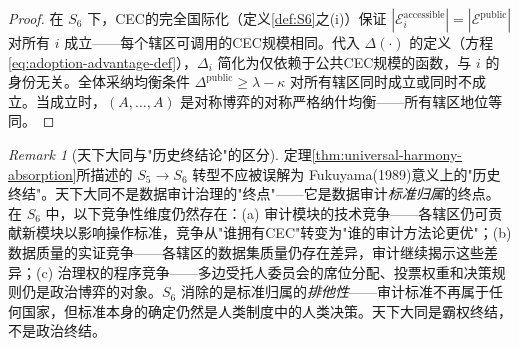 \documentclass[12pt,a4paper]{ctexart}
\theoremstyle{definition}
\theoremstyle{remark}
\newtheorem{remark}{Remark}[section]
\begin{document}
\begin{proof}
在 $S_6$ 下，CEC的完全国际化（定义\ref{def:S6}之(i)）保证 $|\mathcal{E}_i^{\text{accessible}}| = |\mathcal{E}^{\text{public}}|$ 对所有 $i$ 成立——每个辖区可调用的CEC规模相同。代入 $\Delta(\cdot)$ 的定义（方程\ref{eq:adoption-advantage-def}），$\Delta_i$ 简化为仅依赖于公共CEC规模的函数，与 $i$ 的身份无关。全体采纳均衡条件 $\Delta^{\text{public}} \geq \lambda - \kappa$ 对所有辖区同时成立或同时不成立。当成立时，$(A, \ldots, A)$ 是对称博弈的对称严格纳什均衡——所有辖区地位等同。
\end{proof}

\begin{remark}[天下大同与"历史终结论"的区分]
定理\ref{thm:universal-harmony-absorption}所描述的 $S_5 \to S_6$ 转型不应被误解为 Fukuyama(1989)意义上的"历史终结"。天下大同不是数据审计治理的"终点"——它是数据审计\textit{标准归属}的终点。在 $S_6$ 中，以下竞争性维度仍然存在：(a) 审计模块的技术竞争——各辖区仍可贡献新模块以影响操作标准，竞争从"谁拥有CEC"转变为"谁的审计方法论更优"；(b) 数据质量的实证竞争——各辖区的数据集质量仍存在差异，审计继续揭示这些差异；(c) 治理权的程序竞争——多边受托人委员会的席位分配、投票权重和决策规则仍是政治博弈的对象。$S_6$ 消除的是标准归属的\textit{排他性}——审计标准不再属于任何国家，但标准本身的确定仍然是人类制度中的人类决策。天下大同是霸权终结，不是政治终结。
\end{remark}
\end{document}
